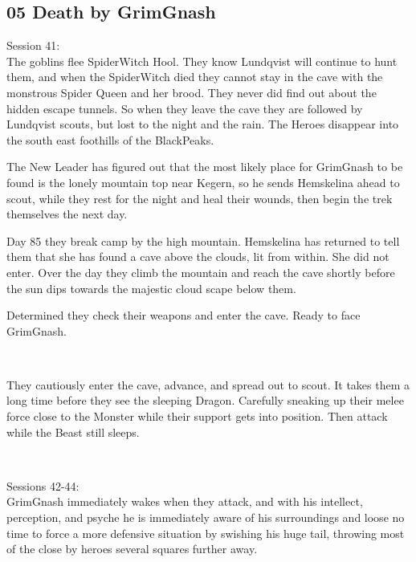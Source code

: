 \subsection*{05 Death by GrimGnash}

\forceindent Session 41:\\                                              %
The goblins flee SpiderWitch Hool. They know Lundqvist will continue to hunt them, and when the SpiderWitch died they cannot stay in the cave with the monstrous Spider Queen and her brood. They never did find out about the hidden escape tunnels. So when they leave the cave they are followed by Lundqvist scouts, but lost to the night and the rain. The Heroes disappear into the south east foothills of the BlackPeaks.

The New Leader has figured out that the most likely place for GrimGnash to be found is the lonely mountain top near Kegern, so he sends Hemskelina ahead to scout, while they rest for the night and heal their wounds, then begin the trek themselves the next day.

Day 85 they break camp by the high mountain. Hemskelina has returned to tell them that she has found a cave above the clouds, lit from within. She did not enter. Over the day they climb the mountain and reach the cave shortly before the sun dips towards the majestic cloud scape below them.

Determined they check their weapons and enter the cave. Ready to face GrimGnash.

\

They cautiously enter the cave, advance, and spread out to scout. It takes them a long time before they see the sleeping Dragon. Carefully sneaking up their melee force close to the Monster while their support gets into position. Then attack while the Beast still sleeps.

\


\forceindent Sessions 42-44:\\   
GrimGnash immediately wakes when they attack, and with his intellect, perception, and psyche he is immediately aware of his surroundings and loose no time to force a more defensive situation by swishing his huge tail, throwing most of the close by heroes several squares further away.





